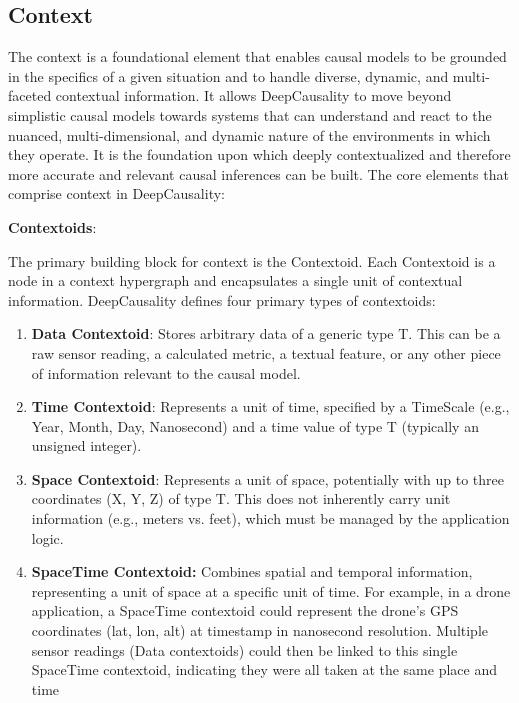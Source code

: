 \newpage

\subsection{Context}
\label{sec:deep_causality_context}

The context is a foundational element that enables causal models to be grounded in the specifics of a given situation and to handle diverse, dynamic, and multi-faceted contextual information. It allows DeepCausality to move beyond simplistic causal models towards systems that can understand and react to the nuanced, multi-dimensional, and dynamic nature of the environments in which they operate. It is the foundation upon which deeply contextualized and therefore more accurate and relevant causal inferences can be built. The core elements that comprise context in DeepCausality:

\textbf{Contextoids}: 

The primary building block for context is the Contextoid. Each Contextoid is a node in a context hypergraph and encapsulates a single unit of contextual information. DeepCausality defines four primary types of contextoids:

\begin{enumerate}
    \item \textbf{Data Contextoid}: Stores arbitrary data of a generic type T. This can be a raw sensor reading, a calculated metric, a textual feature, or any other piece of information relevant to the causal model.
    \item \textbf{Time Contextoid}: Represents a unit of time, specified by a TimeScale (e.g., Year, Month, Day, Nanosecond) and a time value of type T (typically an unsigned integer).
    \item \textbf{Space Contextoid}: Represents a unit of space, potentially with up to three coordinates (X, Y, Z) of type T. This does not inherently carry unit information (e.g., meters vs. feet), which must be managed by the application logic.
    \item \textbf{SpaceTime Contextoid:} Combines spatial and temporal information, representing a unit of space at a specific unit of time. For example, in a drone application, a SpaceTime contextoid could represent the drone's GPS coordinates (lat, lon, alt) at timestamp in nanosecond resolution. Multiple sensor readings (Data contextoids) could then be linked to this single SpaceTime contextoid, indicating they were all taken at the same place and time
\end{enumerate}

